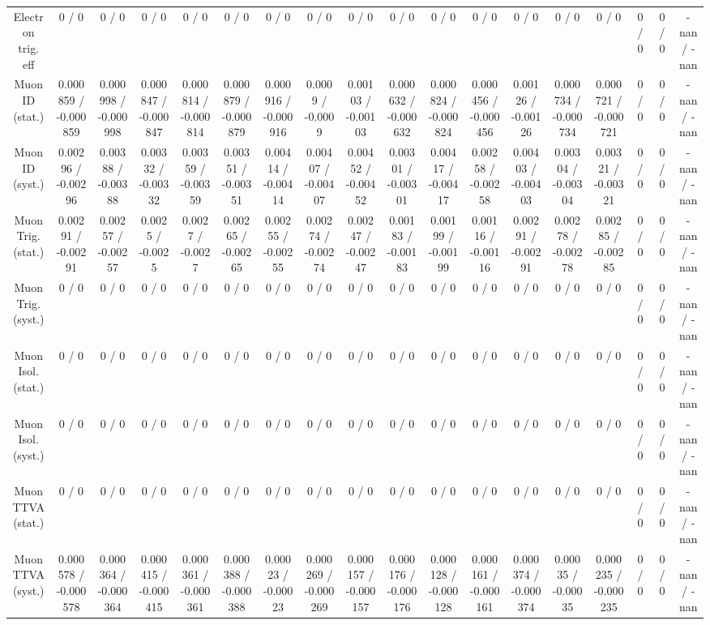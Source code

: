 \documentclass[10pt]{article}
\begin{document}
\begin{table}[htbp]
\begin{center}
\begin{tabular}{|c|c|c|c|c|c|c|c|c|c|c|c|c|c|c|c|c|c|}
  Electron trig. eff & 0 / 0 & 0 / 0 & 0 / 0 & 0 / 0 & 0 / 0 & 0 / 0 & 0 / 0 & 0 / 0 & 0 / 0 & 0 / 0 & 0 / 0 & 0 / 0 & 0 / 0 & 0 / 0 & 0 / 0 & 0 / 0 & -nan / -nan \\ 
  Muon ID (stat.) & 0.000859 / -0.000859 & 0.000998 / -0.000998 & 0.000847 / -0.000847 & 0.000814 / -0.000814 & 0.000879 / -0.000879 & 0.000916 / -0.000916 & 0.0009 / -0.0009 & 0.00103 / -0.00103 & 0.000632 / -0.000632 & 0.000824 / -0.000824 & 0.000456 / -0.000456 & 0.00126 / -0.00126 & 0.000734 / -0.000734 & 0.000721 / -0.000721 & 0 / 0 & 0 / 0 & -nan / -nan \\ 
  Muon ID (syst.) & 0.00296 / -0.00296 & 0.00388 / -0.00388 & 0.00332 / -0.00332 & 0.00359 / -0.00359 & 0.00351 / -0.00351 & 0.00414 / -0.00414 & 0.00407 / -0.00407 & 0.00452 / -0.00452 & 0.00301 / -0.00301 & 0.00417 / -0.00417 & 0.00258 / -0.00258 & 0.00403 / -0.00403 & 0.00304 / -0.00304 & 0.00321 / -0.00321 & 0 / 0 & 0 / 0 & -nan / -nan \\ 
  Muon Trig. (stat.) & 0.00291 / -0.00291 & 0.00257 / -0.00257 & 0.0025 / -0.0025 & 0.0027 / -0.0027 & 0.00265 / -0.00265 & 0.00255 / -0.00255 & 0.00274 / -0.00274 & 0.00247 / -0.00247 & 0.00183 / -0.00183 & 0.00199 / -0.00199 & 0.00116 / -0.00116 & 0.00291 / -0.00291 & 0.00278 / -0.00278 & 0.00285 / -0.00285 & 0 / 0 & 0 / 0 & -nan / -nan \\ 
  Muon Trig. (syst.) & 0 / 0 & 0 / 0 & 0 / 0 & 0 / 0 & 0 / 0 & 0 / 0 & 0 / 0 & 0 / 0 & 0 / 0 & 0 / 0 & 0 / 0 & 0 / 0 & 0 / 0 & 0 / 0 & 0 / 0 & 0 / 0 & -nan / -nan \\ 
  Muon Isol. (stat.) & 0 / 0 & 0 / 0 & 0 / 0 & 0 / 0 & 0 / 0 & 0 / 0 & 0 / 0 & 0 / 0 & 0 / 0 & 0 / 0 & 0 / 0 & 0 / 0 & 0 / 0 & 0 / 0 & 0 / 0 & 0 / 0 & -nan / -nan \\ 
  Muon Isol. (syst.) & 0 / 0 & 0 / 0 & 0 / 0 & 0 / 0 & 0 / 0 & 0 / 0 & 0 / 0 & 0 / 0 & 0 / 0 & 0 / 0 & 0 / 0 & 0 / 0 & 0 / 0 & 0 / 0 & 0 / 0 & 0 / 0 & -nan / -nan \\ 
  Muon TTVA (stat.) & 0 / 0 & 0 / 0 & 0 / 0 & 0 / 0 & 0 / 0 & 0 / 0 & 0 / 0 & 0 / 0 & 0 / 0 & 0 / 0 & 0 / 0 & 0 / 0 & 0 / 0 & 0 / 0 & 0 / 0 & 0 / 0 & -nan / -nan \\ 
  Muon TTVA (syst.) & 0.000578 / -0.000578 & 0.000364 / -0.000364 & 0.000415 / -0.000415 & 0.000361 / -0.000361 & 0.000388 / -0.000388 & 0.00023 / -0.00023 & 0.000269 / -0.000269 & 0.000157 / -0.000157 & 0.000176 / -0.000176 & 0.000128 / -0.000128 & 0.000161 / -0.000161 & 0.000374 / -0.000374 & 0.00035 / -0.00035 & 0.000235 / -0.000235 & 0 / 0 & 0 / 0 & -nan / -nan \\ 

\end{tabular}
\end{center}
\end{table}
\end{document}
